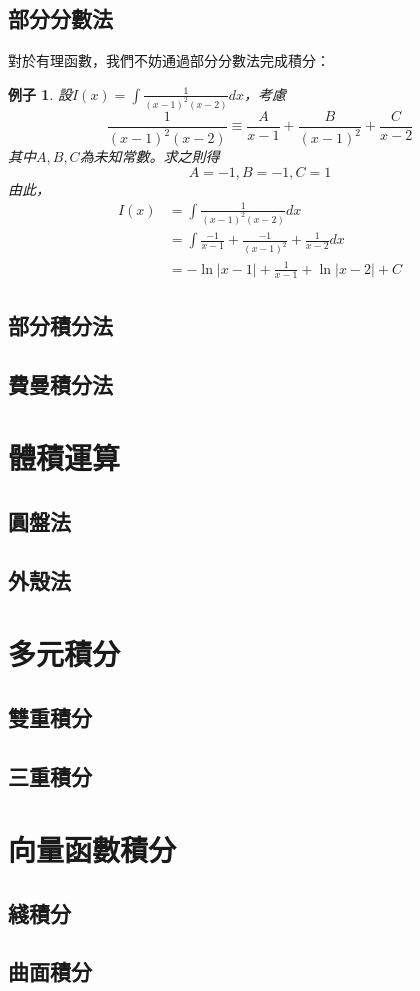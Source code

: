 \documentclass[12pt]{article}
\newtheorem*{example}{例子}
\begin{document}
    \subsection*{部分分數法}
    對於有理函數，我們不妨通過部分分數法完成積分：
    \begin{example}
        設$I(x)=\int \frac{1}{(x-1)^2(x-2)} dx$，考慮\[\frac{1}{(x-1)^2(x-2)}\equiv\frac{A}{x-1}+\frac{B}{(x-1)^2}+\frac{C}{x-2}\]其中$A,B,C$為未知常數。求之則得\[A=-1,B=-1,C=1\]
        由此，\begin{align*}
            I(x)&=\int \frac{1}{(x-1)^2(x-2)} dx\\
            &=\int \frac{-1}{x-1}+\frac{-1}{(x-1)^2}+\frac{1}{x-2} dx\\
            &=-\ln|x-1|+\frac{1}{x-1}+\ln|x-2|+C
        \end{align*}
    \end{example}
    \subsection*{部分積分法}
    
    \subsection*{費曼積分法}
    \section*{體積運算}
    \subsection*{圓盤法}
    \subsection*{外殼法}
    \section*{多元積分}
    \subsection*{雙重積分}
    \subsection*{三重積分}
    \section*{向量函數積分}
    \subsection*{綫積分}
    \subsection*{曲面積分}
\end{document}
